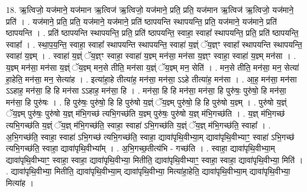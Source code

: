 \documentclass[17pt]{extarticle}
\begin{document}
18. ऋ॒त्विजो॒ यज॑माने॒ यज॑मान ऋ॒त्विज॑ ऋ॒त्विजो॒ यज॑माने॒ प्रति॒ प्रति॒ यज॑मान ऋ॒त्विज॑ ऋ॒त्विजो॒ यज॑माने॒ प्रति॑ । . यज॑माने॒ प्रति॒ प्रति॒ यज॑माने॒ यज॑माने॒ प्रति॑ ष्ठापयन्ति स्थापयन्ति॒ प्रति॒ यज॑माने॒ यज॑माने॒ प्रति॑ ष्ठापयन्ति । . प्रति॑ ष्ठापयन्ति स्थापयन्ति॒ प्रति॒ प्रति॑ ष्ठापयन्ति॒ स्वाहा॒ स्वाहा᳚ स्थापयन्ति॒ प्रति॒ प्रति॑ ष्ठापयन्ति॒ स्वाहा᳚ । . स्था॒प॒य॒न्ति॒ स्वाहा॒ स्वाहा᳚ स्थापयन्ति स्थापयन्ति॒ स्वाहा॑ य॒ज्ञ्ं ॅय॒ज्ञ्ꣳ स्वाहा᳚ स्थापयन्ति स्थापयन्ति॒ स्वाहा॑ य॒ज्ञ्म् । . स्वाहा॑ य॒ज्ञ्ं ॅय॒ज्ञ्ꣳ स्वाहा॒ स्वाहा॑ य॒ज्ञ्म् मन॑सा॒ मन॑सा य॒ज्ञ्ꣳ स्वाहा॒ स्वाहा॑ य॒ज्ञ्म् मन॑सा । . य॒ज्ञ्म् मन॑सा॒ मन॑सा य॒ज्ञ्ं ॅय॒ज्ञ्म् मन॒से तीति॒ मन॑सा य॒ज्ञ्ं ॅय॒ज्ञ्म् मन॒ सेति॑ । . मन॒से तीति॒ मन॑सा॒ मन॒ सेत्या॑ हा॒हेति॒ मन॑सा॒ मन॒ सेत्या॑ह । . इत्या॑हा॒हे तीत्या॑ह॒ मन॑सा॒ मन॑सा॒ ऽऽहे तीत्या॑ह॒ मन॑सा । . आ॒ह॒ मन॑सा॒ मन॑सा ऽऽहाह॒ मन॑सा॒ हि हि मन॑सा ऽऽहाह॒ मन॑सा॒ हि । . मन॑सा॒ हि हि मन॑सा॒ मन॑सा॒ हि पुरु॑षः॒ पुरु॑षो॒ हि मन॑सा॒ मन॑सा॒ हि पुरु॑षः । . हि पुरु॑षः॒ पुरु॑षो॒ हि हि पुरु॑षो य॒ज्ञ्ं ॅय॒ज्ञ्म् पुरु॑षो॒ हि हि पुरु॑षो य॒ज्ञ्म् । . पुरु॑षो य॒ज्ञ्ं ॅय॒ज्ञ्म् पुरु॑षः॒ पुरु॑षो य॒ज्ञ् म॑भि॒गच्छ॑ त्यभि॒गच्छ॑ति य॒ज्ञ्म् पुरु॑षः॒ पुरु॑षो य॒ज्ञ् म॑भि॒गच्छ॑ति । . य॒ज्ञ् म॑भि॒गच्छ॑ त्यभि॒गच्छ॑ति य॒ज्ञ्ं ॅय॒ज्ञ् म॑भि॒गच्छ॑ति॒ स्वाहा॒ स्वाहा॑ ऽभि॒गच्छ॑ति य॒ज्ञ्ं ॅय॒ज्ञ् म॑भि॒गच्छ॑ति॒ स्वाहा᳚ । . अ॒भि॒गच्छ॑ति॒ स्वाहा॒ स्वाहा॑ ऽभि॒गच्छ॑ त्यभि॒गच्छ॑ति॒ स्वाहा॒ द्यावा॑पृथि॒वीभ्या॒म् द्यावा॑पृथि॒वीभ्याꣳ॒॒ स्वाहा॑ ऽभि॒गच्छ॑ त्यभि॒गच्छ॑ति॒ स्वाहा॒ द्यावा॑पृथि॒वीभ्या᳚म् । . अ॒भि॒गच्छ॒तीत्य॑भि - गच्छ॑ति । . स्वाहा॒ द्यावा॑पृथि॒वीभ्या॒म् द्यावा॑पृथि॒वीभ्याꣳ॒॒ स्वाहा॒ स्वाहा॒ द्यावा॑पृथि॒वीभ्या॒ मितीति॒ द्यावा॑पृथि॒वीभ्याꣳ॒॒ स्वाहा॒ स्वाहा॒ द्यावा॑पृथि॒वीभ्या॒ मिति॑ । . द्यावा॑पृथि॒वीभ्या॒ मितीति॒ द्यावा॑पृथि॒वीभ्या॒म् द्यावा॑पृथि॒वीभ्या॒ मित्या॑हा॒हेति॒ द्यावा॑पृथि॒वीभ्या॒म् द्यावा॑पृथि॒वीभ्या॒ मित्या॑ह । \newline
\end{document}

